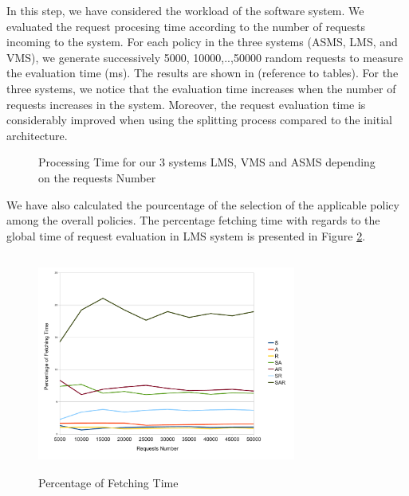 {In this step, we have considered the workload of the software system. We evaluated the request procesing time according to the number of requests incoming to the system. 
For each policy in the three systems (ASMS, LMS, and VMS), we generate successively 5000, 10000,..,50000 random requests to measure the evaluation time (ms).
The results are shown in (reference to tables). For the three systems, we notice that the evaluation time increases when the number of requests increases in the system. 
Moreover, the request evaluation time is considerably improved when using the splitting process compared to the initial architecture.
\begin{figure}
  \centering
  \caption{Processing Time for our 3 systems LMS, VMS and ASMS depending on the requests Number}
  \label{fig:processing time}
\end{figure}

We have also calculated the pourcentage of the selection of the applicable policy among the overall policies. The percentage fetching time with regards to the 
global time of request evaluation in LMS system is presented in Figure \ref{Fetching Time}.
  

\begin{figure}[!h]
  \centering
\includegraphics[width=8.5cm, height=7.2cm]{fetching.pdf}
\begin{center}
\caption{Percentage of Fetching Time}
\label{Fetching Time}
\end{center}
\end{figure}
} 
